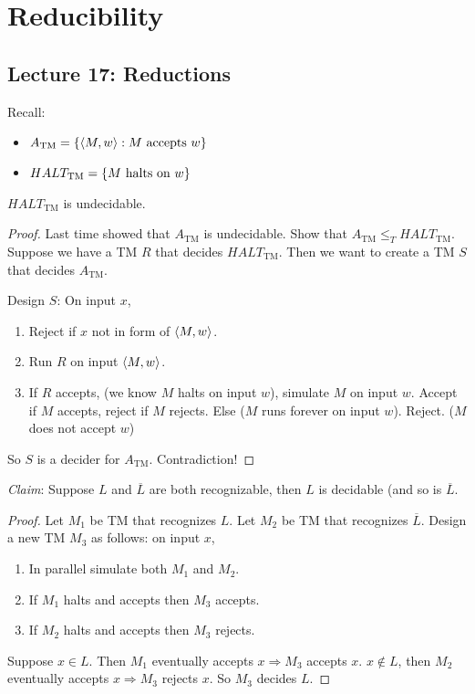 \chapter{Reducibility}

\section*{Lecture 17: Reductions}

Recall:

\begin{itemize}
    \item $A_{\text{TM}} = \left \{ \left \langle M, w \right \rangle : M \text{ accepts } w \right \}$
    \item $HALT_{\text{TM}} = \left \{ M \text{ halts on } w \right \}$
\end{itemize}

\begin{theorem}
    $HALT_{\text{TM}}$ is undecidable.
\end{theorem}


\begin{proof}
    Last time showed that $A_{\text{TM}}$ is undecidable. Show that $A_{\text{TM}} \leq_{T} HALT_{\text{TM}}$. Suppose we have a TM $R$ that decides $HALT_{\text{TM}}$. Then we want to create a TM $S$ that decides $A_{\text{TM}}$.

  Design $S$: On input $x$,

  \begin{enumerate}
        \item Reject if $x$ not in form of $\left \langle M, w \right \rangle$.
        \item Run $R$ on input $\left \langle M, w \right \rangle$.
        \item If $R$ accepts, (we know $M$ halts on input $w$), simulate $M$ on input $w$. Accept if $M$ accepts, reject if $M$ rejects. Else ($M$ runs forever on input $w$). Reject. ($M$ does not accept $w$)
  \end{enumerate}

  So $S$ is a decider for $A_{\text{TM}}$. Contradiction!
\end{proof}

\emph{Claim}: Suppose $L$ and $\overline{L}$ are both recognizable, then $L$ is decidable (and so is $\overline{L}$.

\begin{proof}
    Let $M_1$ be TM that recognizes $L$. Let $M_2$ be TM that recognizes $\overline{L}$. Design a new TM $M_3$ as follows: on input $x$,

  \begin{enumerate}
        \item In parallel simulate both $M_1$ and $M_2$.
        \item If $M_1$ halts and accepts then $M_3$ accepts.
        \item If $M_2$ halts and accepts then $M_3$ rejects.
  \end{enumerate}

    Suppose $x \in L$. Then $M_1$ eventually accepts $x \Rightarrow M_3$ accepts $x$. $x \notin L$, then $M_2$ eventually accepts $x \Rightarrow M_3$ rejects $x$. So $M_3$ decides $L$.
\end{proof}

